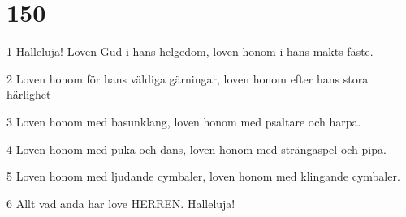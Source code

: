 \chapter{150}

\par 1 Halleluja! Loven Gud i hans helgedom, loven honom i hans makts fäste.
\par 2 Loven honom för hans väldiga gärningar, loven honom efter hans stora härlighet
\par 3 Loven honom med basunklang, loven honom med psaltare och harpa.
\par 4 Loven honom med puka och dans, loven honom med strängaspel och pipa.
\par 5 Loven honom med ljudande cymbaler, loven honom med klingande cymbaler.
\par 6 Allt vad anda har love HERREN. Halleluja!


